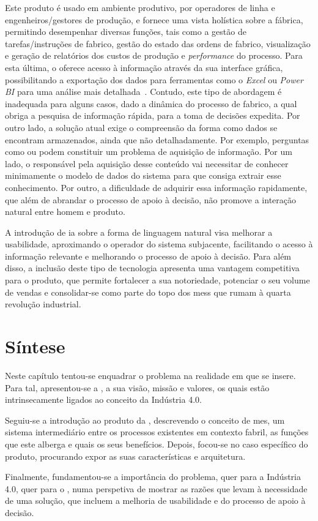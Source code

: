 Este produto é usado em ambiente produtivo, por operadores de linha e engenheiros/gestores de produção, e fornece uma vista holística sobre a fábrica, permitindo desempenhar diversas funções, tais como a gestão de tarefas/instruções de fabrico, gestão do estado das ordens de fabrico, visualização e geração de relatórios dos custos de produção e \textit{performance} do processo. Para esta última, o {\productname} oferece acesso à informação através da sua interface gráfica, possibilitando a exportação dos dados para ferramentas como o \textit{Excel} ou \textit{Power BI} para uma análise mais detalhada~\parencite{cmf_services_bi}. Contudo, este tipo de abordagem é inadequada para alguns casos, dado a dinâmica do processo de fabrico, a qual  obriga a pesquisa de informação rápida, para a toma de decisões expedita. Por outro lado, a solução atual exige o compreensão da forma como dados se encontram armazenados, ainda que não detalhadamente. Por exemplo, perguntas como  ou  podem constituir um problema de aquisição de informação. Por um lado, o responsável pela aquisição desse conteúdo vai necessitar de conhecer minimamente o modelo de dados do sistema para que consiga extrair esse conhecimento. Por outro, a dificuldade de adquirir essa informação rapidamente, que além de abrandar o processo de apoio à decisão, não promove a interação natural entre homem e produto.

A introdução de \gls{ia} sobre a forma de linguagem natural visa melhorar a usabilidade, aproximando o operador do sistema subjacente, facilitando o acesso à informação relevante e melhorando o processo de apoio à decisão. Para além disso, a inclusão deste tipo de tecnologia apresenta uma vantagem competitiva para o produto, que permite fortalecer a sua notoriedade, potenciar o seu volume de vendas e consolidar-se como parte do topo dos \glspl{mes} que rumam à quarta revolução industrial.

\section{Síntese}
\label{sec:chap02_chaptersummary}
Neste capítulo tentou-se enquadrar o problema na realidade em que se insere. Para tal, apresentou-se a {\companyname}, a sua visão, missão e valores, os quais estão intrinsecamente ligados ao conceito da Indústria 4.0. 

Seguiu-se a introdução ao produto da {\companyname}, descrevendo o conceito de \gls{mes}, um sistema intermediário entre os processos existentes em contexto fabril, as funções que este alberga e quais os seus benefícios. Depois, focou-se no caso específico do produto, procurando expor as suas características e arquitetura.

Finalmente, fundamentou-se a importância do problema, quer para a Indústria 4.0, quer para o {\productname}, numa perspetiva de mostrar as razões que levam à necessidade de uma solução, que incluem a melhoria de usabilidade e do processo de apoio à decisão.